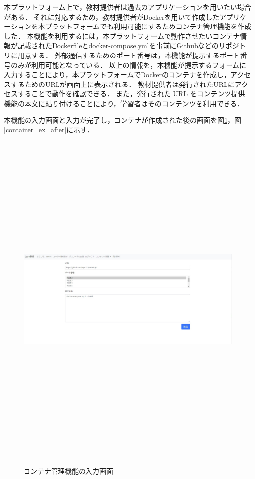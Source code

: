 本プラットフォーム上で，教材提供者は過去のアプリケーションを用いたい場合がある．
それに対応するため，教材提供者がDockerを用いて作成したアプリケーションを本プラットフォームでも利用可能にするためコンテナ管理機能を作成した．
本機能を利用するには，本プラットフォームで動作させたいコンテナ情報が記載されたDockerfileとdocker-compose.ymlを事前にGithubなどのリポジトリに用意する．
外部通信するためのポート番号は，本機能が提示するポート番号のみが利用可能となっている．
以上の情報を，本機能が提示するフォームに入力することにより，本プラットフォームでDockerのコンテナを作成し，アクセスするためのURLが画面上に表示される．
教材提供者は発行されたURLにアクセスすることで動作を確認できる．
また，発行された URL をコンテンツ提供機能の本文に貼り付けることにより，学習者はそのコンテンツを利用できる．

本機能の入力画面と入力が完了し，コンテナが作成された後の画面を図\ref{container_ex_before}，図\ref{container_ex_after}に示す．

\begin{figure}[htbp]
    \begin{center}
        \includegraphics[width=18cm,height=17cm,keepaspectratio]{container_before-crop.pdf}\\
    \end{center}
    \caption{コンテナ管理機能の入力画面}
    \label{container_ex_before}
\end{figure}

